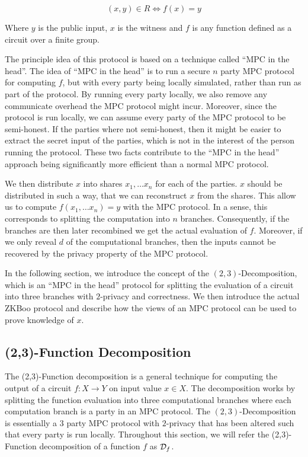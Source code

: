 \[
  (x, y) \in R \iff f(x) = y
\]

Where $y$ is the public input, $x$ is the witness and $f$ is any function
defined as a circuit over a finite group.

The principle idea of this protocol is based on a technique called ``MPC in the
head''. The idea of ``MPC in the head'' is to run a secure $n$ party MPC protocol for computing
$f$, but with every party being locally simulated, rather than run as part of
the protocol.
By running every party locally, we also remove any communicate overhead the MPC
protocol might incur. Moreover, since the protocol is run locally, we can assume
every party of the MPC protocol to be semi-honest. If the parties where not
semi-honest, then it might be easier to extract the secret input of the parties,
which is not in the interest of the person running the protocol.
These two facts contribute to the ``MPC in the head'' approach being significantly
more efficient than a normal MPC protocol.

We then distribute $x$ into shares $x_1, \dots x_{n}$ for each of the parties. $x$ should be
distributed in such a way, that we can reconstruct $x$ from the shares. This
allow us to compute $f(x_{1}, \dots x_{n}) = y$ with the MPC protocol.
In a sense, this corresponds to splitting the computation
into $n$ branches. Consequently, if the branches are then later recombined
we get the actual evaluation of $f$.
Moreover, if we only reveal $d$ of the computational branches, then the inputs
cannot be recovered by the privacy property of the MPC protocol.

In the following section, we introduce the concept of the $(2,3)$-Decomposition,
which is an ``MPC in the head'' protocol for splitting the evaluation of a
circuit into three branches with $2$-privacy and correctness. We then introduce
the actual ZKBoo protocol and describe how the views of an MPC protocol can be
used to prove knowledge of $x$.

\subsection{(2,3)-Function Decomposition}
\label{subsec:decomposition}
The (2,3)-Function decomposition is a general technique for computing the output of
a circuit $f : X \rightarrow Y$ on input value $x \in X$.
The decomposition works by splitting the function evaluation into three
computational branches where each computation branch is a party in an MPC
protocol. The $(2,3)$-Decomposition is essentially a $3$ party MPC protocol with
$2$-privacy that has been altered such that every party is run locally.
Throughout this section, we will refer the (2,3)-Function decomposition
of a function $f$ as $\mathcal{D}_{f}$.

